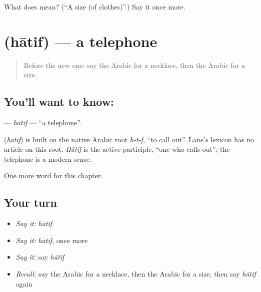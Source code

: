\begin{tcolorbox}[breakable,colback=teal!4,colframe=teal!35!black,title={Before you move on}]
What does  mean? (\textquotedblleft{}A size (of clothes)\textquotedblright{}.) Say it once more.
\end{tcolorbox}
\section[\texorpdfstring{\ar{هاتف} (hātif)}{هاتف (hātif)}]{ (hātif) — a telephone}

\label{lesson:AR-C245-hatif}



\begin{quote}
Before the new one: say the Arabic for a necklace, then the Arabic for a size.
\end{quote}

\subsection*{You'll want to know: }
\textbf{} — \emph{hātif} — \textquotedblleft{}a telephone\textquotedblright{}.

\begin{cousinweb}
\textbf{} (\emph{hātif}) is built on the native Arabic root \emph{h-t-f}, \textquotedblleft{}to call out\textquotedblright{}. Lane's lexicon has no article on this root. \emph{Hātif} is the active participle, \textquotedblleft{}one who calls out\textquotedblright{}; the telephone is a modern sense.
\end{cousinweb}

\begin{grammarlens}[title={What you've built}]
One more word for this chapter.
\end{grammarlens}

\subsection*{Your turn}
\begin{itemize}
\raggedright
  \item \emph{Say it:} \emph{hātif}
  \item \emph{Say it:} \emph{hātif}, once more
  \item \emph{Say it:} say \emph{hātif}
  \item \emph{Recall:} say the Arabic for a necklace, then the Arabic for a size, then say \emph{hātif} again
\end{itemize}

